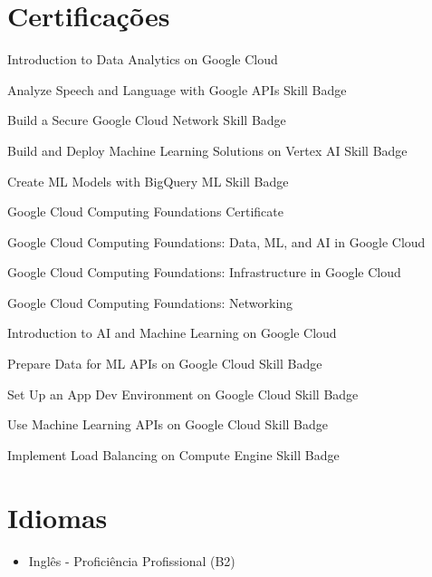 \documentclass[letterpaper,11pt]{article}
\begin{document}
 \section{Certificações}
    \item Introduction to Data Analytics on Google Cloud \\
    \item Analyze Speech and Language with Google APIs Skill Badge
    \item Build a Secure Google Cloud Network Skill Badge
    \item Build and Deploy Machine Learning Solutions on Vertex AI Skill Badge
    \item Create ML Models with BigQuery ML Skill Badge
    \item Google Cloud Computing Foundations Certificate
    \item Google Cloud Computing Foundations: Data, ML, and AI in Google Cloud
    \item Google Cloud Computing Foundations: Infrastructure in Google Cloud
    \item Google Cloud Computing Foundations: Networking
    \item Introduction to AI and Machine Learning on Google Cloud
    \item Prepare Data for ML APIs on Google Cloud Skill Badge
    \item Set Up an App Dev Environment on Google Cloud Skill Badge
    \item Use Machine Learning APIs on Google Cloud Skill Badge
    \item Implement Load Balancing on Compute Engine Skill Badge
 \vspace{-8pt}

\section{Idiomas}
\begin{itemize}[leftmargin=0.15in, label={}]
\item Inglês - Proficiência Profissional (B2)
\vspace{-16pt}
\end{itemize}
\end{document}
